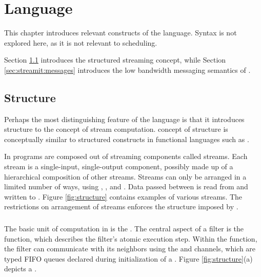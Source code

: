 \section{{\StreamIt} Language}
\label{chpt:streamit}

This chapter introduces relevant constructs of the {\StreamIt}
language.  Syntax is not explored here, as it is not relevant to
{\StreamIt} scheduling.

Section \ref{sec:streamit:struct} introduces the structured
streaming concept, while Section \ref{sec:streamit:messages}
introduces the low bandwidth messaging semantics of {\StreamIt}.

\subsection{Structure}
\label{sec:streamit:struct}

Perhaps the most distinguishing feature of the {\StreamIt} language is
that it introduces structure to the concept of stream computation.
{\StreamIt} concept of structure is conceptually similar to structured
constructs in functional languages such as \C.

In {\StreamIt} programs are composed out of streaming components
called streams.  Each stream is a single-input, single-output
component, possibly made up of a hierarchical composition of other
streams. Streams can only be arranged in a limited number of ways,
using {\pipelines}, {\splitjoins}, and {\feedbackloops}.  Data
passed between {\filters} is read from and written to {\Channels}.
Figure \ref{fig:structure} contains examples of various
{\StreamIt} streams.  The restrictions on arrangement of streams
enforces the structure imposed by {\StreamIt}.

\subsubsection{\filters}

The basic unit of computation in {\StreamIt} is the {\filter}. The
central aspect of a filter is the {\work} function, which
describes the filter's atomic execution step. Within the {\work}
function, the filter can communicate with its neighbors using the
{\Input} and {\Output} channels, which are typed FIFO queues
declared during initialization of a {\filter}.  Figure
\ref{fig:structure}(a) depicts a {\filter}.

